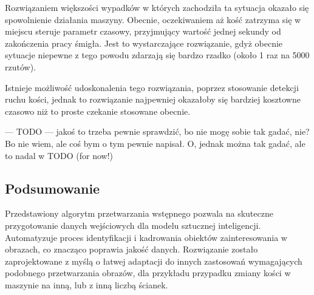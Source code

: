Rozwiązaniem większości wypadków w których zachodziła ta sytuacja okazało się spowolnienie działania maszyny.
Obecnie, oczekiwaniem aż kość zatrzyma się w miejscu steruje parametr czasowy, przyjmujący wartość jednej sekundy od zakończenia pracy śmigła.
Jest to wystarczające rozwiązanie, gdyż obecnie sytuacje niepewne z tego powodu zdarzają się bardzo rzadko (około 1 raz na 5000 rzutów).

Istnieje możliwość udoskonalenia tego rozwiązania, poprzez stosowanie detekcji ruchu kości,
jednak to rozwiązanie najpewniej okazałoby się bardziej kosztowne czasowo niż to proste czekanie stosowane obecnie.


--- TODO ---
jakoś to trzeba pewnie sprawdzić, bo nie mogę sobie tak gadać, nie?
Bo nie wiem, ale coś bym o tym pewnie napisał.
O, jednak można tak gadać, ale to nadal w TODO (for now!)



\subsection{Podsumowanie}

Przedstawiony algorytm przetwarzania wstępnego pozwala na skuteczne przygotowanie danych wejściowych dla modelu sztucznej inteligencji.
Automatyzuje proces identyfikacji i kadrowania obiektów zainteresowania w obrazach, co znacząco poprawia jakość danych.
Rozwiązanie zostało zaprojektowane z myślą o łatwej adaptacji do innych zastosowań wymagających podobnego przetwarzania obrazów,
dla przykładu przypadku zmiany kości w maszynie na inną, lub z inną liczbą ścianek.

